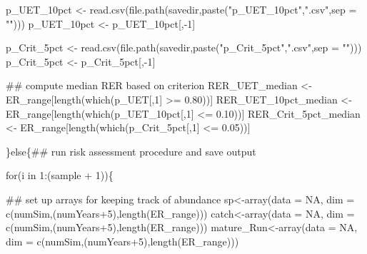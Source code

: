 \documentclass[
  11pt,
]{article}
\newenvironment{Shaded}{}{}
\newcommand{\CommentTok}[1]{\textcolor[rgb]{0.00,0.50,0.00}{#1}}
\newcommand{\ControlFlowTok}[1]{\textcolor[rgb]{0.00,0.00,1.00}{#1}}
\newcommand{\DataTypeTok}[1]{#1}
\newcommand{\DecValTok}[1]{#1}
\newcommand{\FloatTok}[1]{#1}
\newcommand{\KeywordTok}[1]{\textcolor[rgb]{0.00,0.00,1.00}{#1}}
\newcommand{\NormalTok}[1]{#1}
\newcommand{\OperatorTok}[1]{#1}
\newcommand{\OtherTok}[1]{\textcolor[rgb]{1.00,0.25,0.00}{#1}}
\newcommand{\StringTok}[1]{\textcolor[rgb]{0.00,0.50,0.50}{#1}}
\begin{document}
\begin{Shaded}
\begin{Highlighting}[]
\NormalTok{  p_UET_10pct <-}\StringTok{ }\KeywordTok{read.csv}\NormalTok{(}\KeywordTok{file.path}\NormalTok{(savedir,}\KeywordTok{paste}\NormalTok{(}\StringTok{"p_UET_10pct"}\NormalTok{,}\StringTok{".csv"}\NormalTok{,}\DataTypeTok{sep =} \StringTok{""}\NormalTok{)))}
\NormalTok{  p_UET_10pct <-}\StringTok{ }\NormalTok{p_UET_10pct[,}\OperatorTok{-}\DecValTok{1}\NormalTok{]}
  
\NormalTok{  p_Crit_5pct <-}\StringTok{ }\KeywordTok{read.csv}\NormalTok{(}\KeywordTok{file.path}\NormalTok{(savedir,}\KeywordTok{paste}\NormalTok{(}\StringTok{"p_Crit_5pct"}\NormalTok{,}\StringTok{".csv"}\NormalTok{,}\DataTypeTok{sep =} \StringTok{""}\NormalTok{)))}
\NormalTok{  p_Crit_5pct <-}\StringTok{ }\NormalTok{p_Crit_5pct[,}\OperatorTok{-}\DecValTok{1}\NormalTok{]}
  
  \CommentTok{## compute median RER based on criterion}
\NormalTok{  RER_UET_median <-}\StringTok{ }\NormalTok{ER_range[}\KeywordTok{length}\NormalTok{(}\KeywordTok{which}\NormalTok{(p_UET[,}\DecValTok{1}\NormalTok{] }\OperatorTok{>=}\StringTok{ }\FloatTok{0.80}\NormalTok{))]}
\NormalTok{  RER_UET_10pct_median <-}\StringTok{ }\NormalTok{ER_range[}\KeywordTok{length}\NormalTok{(}\KeywordTok{which}\NormalTok{(p_UET_10pct[,}\DecValTok{1}\NormalTok{] }\OperatorTok{<=}\StringTok{ }\FloatTok{0.10}\NormalTok{))]}
\NormalTok{  RER_Crit_5pct_median <-}\StringTok{ }\NormalTok{ER_range[}\KeywordTok{length}\NormalTok{(}\KeywordTok{which}\NormalTok{(p_Crit_5pct[,}\DecValTok{1}\NormalTok{] }\OperatorTok{<=}\StringTok{ }\FloatTok{0.05}\NormalTok{))]}
  
\NormalTok{\}}\ControlFlowTok{else}\NormalTok{\{}\CommentTok{## run risk assessment procedure and save output}
  
  \ControlFlowTok{for}\NormalTok{(i }\ControlFlowTok{in} \DecValTok{1}\OperatorTok{:}\NormalTok{(sample }\OperatorTok{+}\StringTok{ }\DecValTok{1}\NormalTok{))\{}
  
    \CommentTok{## set up arrays for keeping track of abundance}
\NormalTok{    sp<-}\KeywordTok{array}\NormalTok{(}\DataTypeTok{data =} \OtherTok{NA}\NormalTok{, }\DataTypeTok{dim =} \KeywordTok{c}\NormalTok{(numSim,(numYears}\OperatorTok{+}\DecValTok{5}\NormalTok{),}\KeywordTok{length}\NormalTok{(ER_range)))}
\NormalTok{    catch<-}\KeywordTok{array}\NormalTok{(}\DataTypeTok{data =} \OtherTok{NA}\NormalTok{, }\DataTypeTok{dim =} \KeywordTok{c}\NormalTok{(numSim,(numYears}\OperatorTok{+}\DecValTok{5}\NormalTok{),}\KeywordTok{length}\NormalTok{(ER_range)))}
\NormalTok{    mature_Run<-}\KeywordTok{array}\NormalTok{(}\DataTypeTok{data =} \OtherTok{NA}\NormalTok{, }\DataTypeTok{dim =} \KeywordTok{c}\NormalTok{(numSim,(numYears}\OperatorTok{+}\DecValTok{5}\NormalTok{),}\KeywordTok{length}\NormalTok{(ER_range)))}
    

\end{Highlighting}
\end{Shaded}
\end{document}
